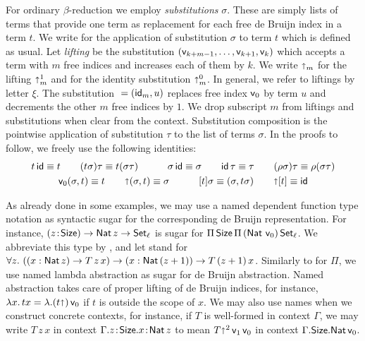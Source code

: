 \documentclass[acmsmall%
]{acmart}\settopmatter{printfolios=true}
\begin{document}
For ordinary $\beta$-reduction we employ \emph{substitutions}
$\sigma$.  These are simply lists of terms that provide one term as
replacement for each free de Bruijn index in a term $t$. We write
 for the application of substitution $\sigma$ to term
$t$ which is defined as usual.  Let \emph{lifting} 
be the substitution $(\ind{k+m-1},\dots,\ind{k+1},\ind k)$ which
accepts a term with $m$ free indices and increases each of them by
$k$.  We write $\slift_m$ for the lifting $\slift^1_m$ and
 for the identity substitution $ \slift^0_m$. In
general, we refer to liftings by letter $\xi$.
%
The substitution ${} = (\sid_m, u)$ replaces free index
$\ind 0$ by term $u$ and decrements the other $m$ free indices by
$1$. We drop subscript $m$ from liftings and substitutions when clear from the context.
%
Substitution composition \fbox{$\sigma\tau$} is the pointwise
application of substitution $\tau$ to the list of terms $\sigma$.  In
the proofs to follow, we freely use the following identities:
\begin{gather*}
  t\,\sid \equiv t
\qquad
  (t\sigma)\tau \equiv t(\sigma\tau)
\qquad\quad
  \sigma\, \sid \equiv \sigma
\qquad
  \sid\, \tau \equiv \tau
\qquad
  (\rho\sigma)\tau \equiv \rho(\sigma\tau)
\\
  \ind 0 (\sigma,t) \equiv t
\qquad
  \slift(\sigma,t) \equiv \sigma
\qquad\quad
  [t]\sigma \equiv (\sigma, t\sigma)
\qquad
  \slift[t] \equiv \sid
\end{gather*}

As already done in some examples, we may use a named dependent
function type notation as syntactic sugar for the corresponding de
Bruijn representation.  For instance,
$\funT z \Size \Nat z \to \Set[\ell]$ is sugar for
$\piT \Size \piT {(\Nat\,\ind 0)} \Set[\ell]$.  We abbreviate this
type by \fbox{$\FixK\,\ell$}, and let  stand for
$\forall z.\ (\sfunT x {\Nat z} T\, z\, x) \to \sfunT x {\Nat (z + 1)} T \,(z+1)\, x$.
%
Similarly to for $\Pi$, we use named lambda abstraction as sugar for de
Bruijn abstraction.  Named abstraction takes care of proper lifting of
de Bruijn indices, for instance,
$\lambda x.\, t x = \lambda. (t \slift)\,\ind 0$ if $t$ is outside the
scope of $x$.
%
We may also use names when we construct concrete contexts, for
instance, if\/ $T$ is well-formed in context $\Gamma$, we may write
$T\,z\,x$ in context $\Gamma.z\of\Size.x\of\Nat z$ to mean
$T\slift^2\,\ind 1\,\ind 0$ in context $\Gamma.\Size.\Nat \ind 0$.
\end{document}
